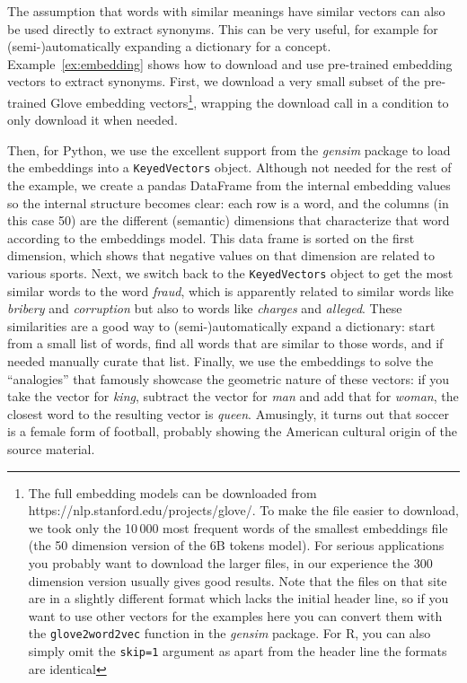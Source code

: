 The assumption that words with similar meanings have similar vectors can also be used directly to extract synonyms.
This can be very useful, for example for (semi-)automatically expanding a dictionary for a concept.
Example~\ref{ex:embedding} shows how to download and use pre-trained embedding vectors to extract synonyms.
First, we download a very small subset of the pre-trained Glove embedding vectors\footnote{The full embedding models can be downloaded from https://nlp.stanford.edu/projects/glove/. To make the file easier to download, we took only the 10\,000 most frequent words of the smallest embeddings file (the 50 dimension version of the 6B tokens model). For serious applications you probably want to download the larger files, in our experience the 300 dimension version usually gives good results. Note that the files on that site are in a slightly different format which lacks the initial header line, so if you want to use other vectors for the examples here you can convert them with the \texttt{glove2word2vec} function in the \emph{gensim} package. For R, you can also simply omit the \verb|skip=1| argument as apart from the header line the formats are identical},
wrapping the download call in a condition to only download it when needed.

Then, for Python, we use the excellent support from the \emph{gensim} package to load the embeddings into a \texttt{KeyedVectors} object.
Although not needed for the rest of the example, we create a pandas DataFrame from the internal embedding values so the internal structure becomes clear: each row is a word, and the columns (in this case 50) are the different (semantic) dimensions that characterize that word according to the embeddings model.
This data frame is sorted on the first dimension, which shows that negative values on that dimension are related to various sports.
Next, we switch back to the \texttt{KeyedVectors} object to get the most similar words to the word \emph{fraud}, which is apparently related to similar words like \emph{bribery} and \emph{corruption} but also to words like \emph{charges} and \emph{alleged}.
These similarities are a good way to (semi-)automatically expand a dictionary: start from a small list of words,
find all words that are similar to those words, and if needed manually curate that list.
Finally, we use the embeddings to solve the ``analogies'' that famously showcase the geometric nature of these vectors:
if you take the vector for \emph{king}, subtract the vector for \emph{man} and add that for \emph{woman},
the closest word to the resulting vector is \emph{queen}.
Amusingly, it turns out that soccer is a female form of football, probably showing the American cultural origin of the source material.

